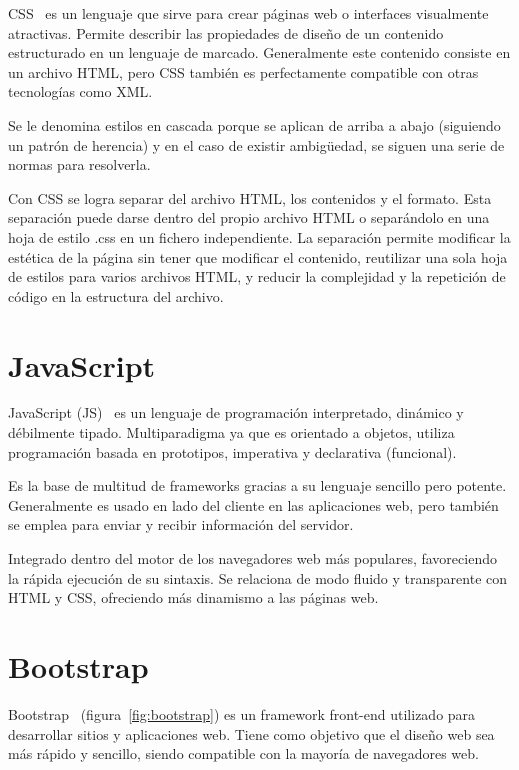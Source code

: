 \documentclass[a4paper, 12pt]{book}
\begin{document}
CSS~\cite{css} es un lenguaje que sirve para crear páginas web o interfaces visualmente atractivas.
Permite describir las propiedades de diseño de un contenido estructurado en un lenguaje de marcado.
Generalmente este contenido consiste en un archivo HTML, pero CSS también es perfectamente compatible con otras tecnologías como XML.

\vspace{5mm}
Se le denomina estilos en cascada porque se aplican de arriba a abajo (siguiendo un patrón de herencia) y en el caso de existir ambigüedad, se siguen una serie de normas para resolverla.

\vspace{5mm}
Con CSS se logra separar del archivo HTML, los contenidos y el formato.
Esta separación puede darse dentro del propio archivo HTML o separándolo en una hoja de estilo .css en un fichero independiente. 
La separación permite modificar la estética de la página sin tener que modificar el contenido, reutilizar una sola hoja de estilos para varios archivos HTML, y reducir la complejidad y la repetición de código en la estructura del archivo.


\section{JavaScript} 
\label{sec:javascript}

JavaScript (JS)~\cite{gauchat2012gran} es un lenguaje de programación interpretado, dinámico y débilmente tipado.
Multiparadigma ya que es orientado a objetos, utiliza programación basada en prototipos, imperativa y declarativa (funcional).

\vspace{5mm}
Es la base de multitud de frameworks gracias a su lenguaje sencillo pero potente. 
Generalmente es usado en lado del cliente en las aplicaciones web, pero también se emplea para enviar y recibir información del servidor.

\vspace{5mm}
Integrado dentro del motor de los navegadores web más populares, favoreciendo la rápida ejecución de su sintaxis.
Se relaciona de modo fluido y transparente con HTML y CSS, ofreciendo más dinamismo a las páginas web.

\newpage
\section{Bootstrap} 
\label{sec:bootstrap}

Bootstrap~\cite{bootstrap} (figura~\ref{fig:bootstrap}) es un framework front-end utilizado para desarrollar sitios y aplicaciones web.
Tiene como objetivo que el diseño web sea más rápido y sencillo, siendo compatible con la mayoría de navegadores web.
\end{document}
